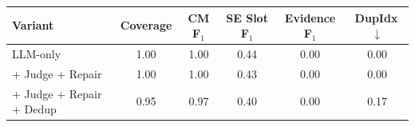 \begin{tabularx}{\textwidth}{@{}l c c c c c@{}}
\toprule
\textbf{Variant} & \textbf{Coverage} & \textbf{CM F$_1$} & \textbf{SE Slot F$_1$} & \textbf{Evidence F$_1$} & \textbf{DupIdx}\,$\downarrow$ \\
\midrule
LLM-only & 1.00 & 1.00 & 0.44 & 0.00 & 0.00 \\
+ Judge + Repair & 1.00 & 1.00 & 0.43 & 0.00 & 0.00 \\
+ Judge + Repair + Dedup & 0.95 & 0.97 & 0.40 & 0.00 & 0.17 \\
\bottomrule
\end{tabularx}